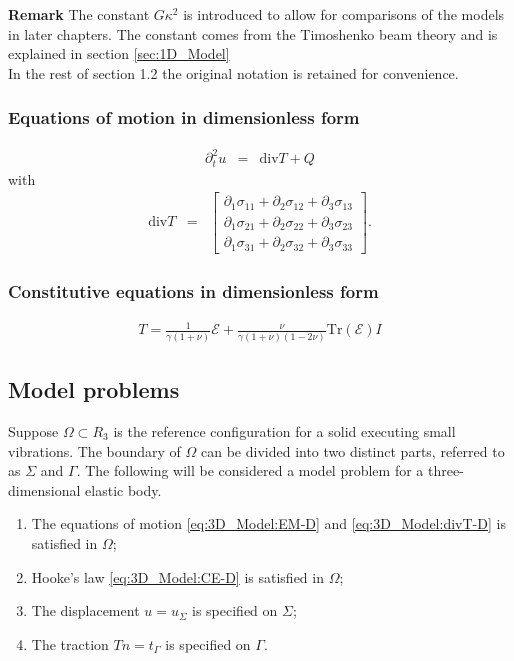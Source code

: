 \documentclass[../../main.tex]{subfiles}
\begin{document}
\textbf{Remark} The constant $G\kappa^2$ is introduced to allow for comparisons of the models in later chapters. The constant comes from the Timoshenko beam theory and is explained in section \ref{sec:1D_Model} \\

In the rest of section 1.2 the original notation is retained for convenience.

\subsubsection*{Equations of motion in dimensionless form}\label{sssec:3D_Model:EquationOfMotionDimensionless}
\begin{eqnarray}
	\partial_t^2 u & = & \textrm{div}T + Q \label{eq:3D_Model:EM-D}
\end{eqnarray}
with
\begin{eqnarray}
	\textrm{div}  T & = &
	\begin{bmatrix}
		\partial_1 \sigma_{11} + \partial_2 \sigma_{12} + \partial_3 \sigma_{13} \\
		\partial_1 \sigma_{21} + \partial_2 \sigma_{22} + \partial_3 \sigma_{23} \\
		\partial_1 \sigma_{31} + \partial_2 \sigma_{32} + \partial_3 \sigma_{33}
	\end{bmatrix}.\label{eq:3D_Model:divT-D}
\end{eqnarray}

\subsubsection*{Constitutive equations in dimensionless form}\label{sssec:3D_Model:ConstitutiveEquationsDimensionless}
\begin{eqnarray}
	T = \frac{1}{\gamma(1+\nu)} \mathcal{E} + \frac{\nu}{\gamma(1+\nu)(1-2\nu)}\textrm{Tr}(\mathcal{E})I \label{eq:3D_Model:CE-D}
\end{eqnarray}

\subsection{Model problems}\label{ssec:3D_Model:ModelProblems}
Suppose $\Omega \subset R_3$ is the reference configuration for a solid
executing small vibrations. The boundary of $\Omega$ can be divided into two
distinct parts, referred to as $\Sigma$ and $\Gamma$. The following will be
considered a model problem for a three-dimensional elastic body.
\begin{enumerate}
	\item[] The equations of motion \eqref{eq:3D_Model:EM-D} and \eqref{eq:3D_Model:divT-D} is satisfied in $\Omega$;
	\item[] Hooke's law \eqref{eq:3D_Model:CE-D} is satisfied in $\Omega$;
	\item[] The displacement $u = u_\Sigma$ is specified on
		$\Sigma$;
	\item[] The traction $Tn = t_\Gamma$ is specified on
		$\Gamma$.
\end{enumerate}
\end{document}
